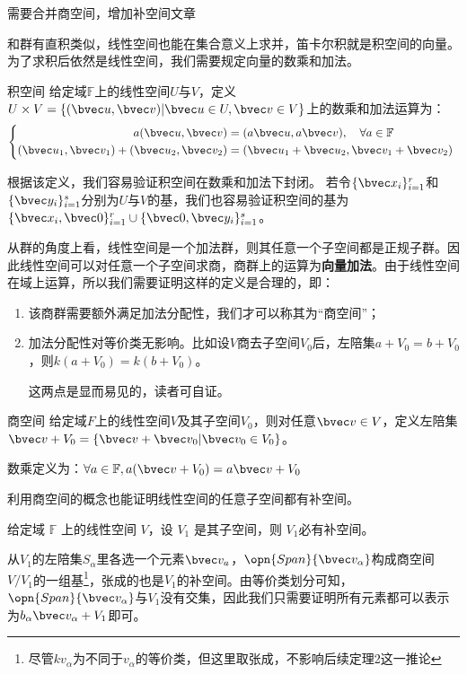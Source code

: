 
\begin{issues}
\issueTODO 需要合并商空间，增加补空间文章
\end{issues}


和群有直积类似，线性空间也能在集合意义上求并，笛卡尔积就是积空间的向量。为了求积后依然是线性空间，我们需要规定向量的数乘和加法。

\begin{definition}{积空间}
给定域$\mathbb F $上的线性空间$U$与$V$，定义$U\times V=\{(\bvec u,\bvec v)|\bvec u\in U,\bvec v\in V\}$上的数乘和加法运算为：
\begin{equation}
\left\{\begin{aligned}
a(\bvec u,\bvec v)&=(a\bvec u,a\bvec v),\quad \forall a\in \mathbb F\\
(\bvec u_1,\bvec v_1)+(\bvec u_2,\bvec v_2)&=(\bvec u_1+\bvec u_2,\bvec v_1+\bvec v_2)
\end{aligned}\right.~
\end{equation}
\end{definition}
根据该定义，我们容易验证积空间在数乘和加法下封闭。
若令$\{\bvec x_i\}^r_{i=1}$和$\{\bvec y_i\}^s_{i=1}$分别为$U$与$V$的基，我们也容易验证积空间的基为$\{\bvec x_i,\bvec 0\}^r_{i=1}\cup \{\bvec 0,\bvec y_i\}^s_{i=1}$。

从群的角度上看，线性空间是一个加法群，则其任意一个子空间都是正规子群。因此线性空间可以对任意一个子空间求商，商群上的运算为\textbf{向量加法}。由于线性空间在域上运算，所以我们需要证明这样的定义是合理的，即：
\begin{enumerate}
\item 该商群需要额外满足加法分配性，我们才可以称其为“商空间”；
\item 加法分配性对等价类无影响。比如设$V$商去子空间$V_0$后，左陪集$a+V_0=b+V_0$，则$k(a+V_0)=k(b+V_0)$。

这两点是显而易见的，读者可自证。
\end{enumerate}
\begin{definition}{商空间}
给定域$F$上的线性空间$V$及其子空间$V_0$，则对任意$\bvec v\in V$，定义左陪集$\bvec v+V_0=\{\bvec v+\bvec v_0|\bvec v_0\in V_0\}$。

数乘定义为：$\forall a\in \mathbb F,a(\bvec v+V_0)=a\bvec v+V_0$
\end{definition}


利用商空间的概念也能证明线性空间的任意子空间都有补空间。
\begin{theorem}{}\label{the_lnal06_1}
给定域 $\mathbb F$ 上的线性空间 $V$，设 $V_1$ 是其子空间，则 $V_1$必有补空间。
\end{theorem}
从$V_1$的左陪集${S_{\alpha}}$里各选一个元素$\bvec v_a$，$\opn{Span} \{\bvec v_{\alpha}\}$构成商空间$V/V_1$的一组基\footnote{尽管$kv_\alpha$为不同于$v_\alpha$的等价类，但这里取张成，不影响后续定理2这一推论}，张成的也是$V_1$的补空间。由等价类划分可知，$\opn{Span} \{\bvec v_{\alpha}\}$与$V_1$没有交集，因此我们只需要证明所有元素都可以表示为$b_{\alpha}\bvec v_{\alpha}+V_1$即可。

